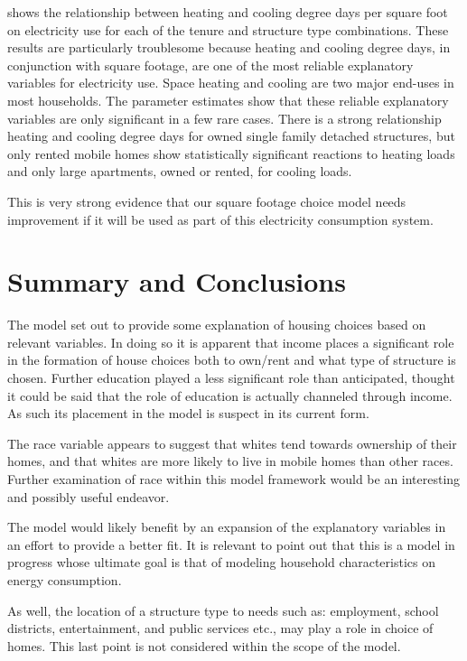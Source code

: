 \documentclass{article}
\begin{document}
shows the relationship between heating and cooling degree days per square foot on electricity use for each of the tenure and structure type combinations.  These results are particularly troublesome because heating and cooling degree days, in conjunction with square footage, are one of the most reliable explanatory variables for electricity use.  Space heating and cooling are two major end-uses in most households.  The parameter estimates show that these reliable explanatory variables are only significant in a few rare cases.  There is a strong relationship heating and cooling degree days for owned single family detached structures, but only rented mobile homes show statistically significant reactions to heating loads and only large apartments, owned or rented, for cooling loads.

This is very strong evidence that our square footage choice model needs improvement if it will be used as part of this electricity consumption system. 

\section{Summary and Conclusions}

The model set out to provide some explanation of housing choices based on relevant variables.  In doing so it is apparent that income places a significant role in the formation of house choices both to own/rent and what type of structure is chosen.  Further education played a less significant role than anticipated, thought it could be said that the role of education is actually channeled through income.  As such its placement in the model is suspect in its current form.

The race variable appears to suggest that whites tend towards ownership of their homes, and that whites are more likely to live in mobile homes than other races.  Further examination of race within this model framework would be an interesting and possibly useful endeavor. 

The model would likely benefit by an expansion of the explanatory variables in an effort to provide a better fit.  It is relevant to point out that this is a model in progress whose ultimate goal is that of modeling household characteristics on energy consumption.


As well, the location of a structure type to needs such as: employment, school districts, entertainment, and public services etc., may play a role in choice of homes.  This last point is not considered within the scope of the model.  
\end{document}
